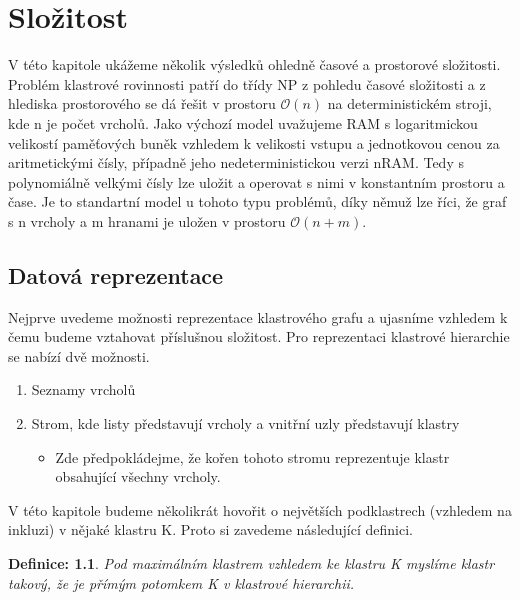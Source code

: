 \documentclass[12pt,a4report]{report}
\newtheorem{defn}{Definice: }[chapter]
\begin{document}
\author{Filip Šedivý}


\chapter{Složitost}

V této kapitole ukážeme několik výsledků ohledně časové a prostorové složitosti.
Problém klastrové rovinnosti patří do třídy NP z pohledu časové složitosti a z hlediska prostorového se dá řešit v prostoru $\mathcal{O}(n)$ na deterministickém stroji, kde n je počet vrcholů. Jako výchozí model uvažujeme RAM s logaritmickou velikostí paměťových buněk vzhledem k velikosti vstupu a jednotkovou cenou za aritmetickými čísly, případně jeho nedeterministickou verzi nRAM. Tedy s  polynomiálně velkými čísly lze uložit a operovat s nimi v konstantním prostoru a čase. Je to standartní model u tohoto typu problémů, díky němuž lze říci, že graf s n vrcholy a m hranami je uložen v prostoru $\mathcal O (n+m)$.

\section{Datová reprezentace}
Nejprve uvedeme možnosti reprezentace klastrového grafu a ujasníme vzhledem k čemu budeme vztahovat příslušnou složitost. 
Pro reprezentaci klastrové hierarchie se nabízí dvě možnosti.

\begin{enumerate}
\item Seznamy vrcholů
\item Strom, kde listy představují vrcholy a vnitřní uzly představují klastry
\begin{itemize}
\item Zde předpokládejme, že kořen tohoto stromu reprezentuje klastr obsahující všechny vrcholy.
\end{itemize}
\end{enumerate}

V této kapitole budeme několikrát hovořit o největších podklastrech (vzhledem na inkluzi) v nějaké klastru K. Proto si zavedeme následující definici.
\begin{defn}
Pod maximálním klastrem vzhledem ke klastru K myslíme klastr takový, že je přímým potomkem K v klastrové hierarchii.
\end{defn}
\end{document}
